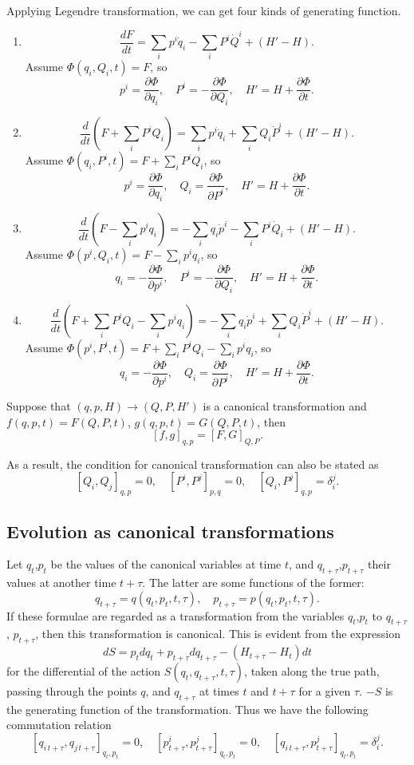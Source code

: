 Applying Legendre transformation, we can get four kinds of generating function. 
\begin{enumerate}
\item \[\frac{dF}{dt} = \sum_i p^i \dot{q}_i - \sum_i P^i \dot{Q}^i + (H'-H).\]
Assume $\Phi(q_i,Q_i,t) = F$, so
\[p^i = \frac{\partial \Phi}{\partial q_i} ,\quad P^i = -\frac{\partial \Phi}{\partial Q_i} ,\quad H' = H + \frac{\partial \Phi}{\partial t}.\]

\item \[\frac{d}{dt}(F+\sum_i P^i Q_i) = \sum_i p^i \dot{q}_i + \sum_i Q_i \dot{P}^i + (H'-H).\]
Assume $\Phi(q_i,P^i,t) = F + \sum_i P^i Q_i$, so
\[p^i = \frac{\partial \Phi}{\partial q_i} ,\quad Q_i = \frac{\partial \Phi}{\partial P^i} ,\quad H' = H + \frac{\partial \Phi}{\partial t}.\]

\item \[\frac{d}{dt}(F-\sum_i p^i q_i) = -\sum_i q_i \dot{p}^i - \sum_i P^i \dot{Q}_i + (H'-H).\]
Assume $\Phi(p^i,Q_i,t) = F - \sum_i p^i q_i$, so
\[q_i = -\frac{\partial \Phi}{\partial p^i} ,\quad P^i = -\frac{\partial \Phi}{\partial Q_i} ,\quad H' = H + \frac{\partial \Phi}{\partial t}.\]

\item \[\frac{d}{dt}(F+\sum_i P^i Q_i-\sum_i p^i q_i) = -\sum_i q_i \dot{p}^i + \sum_i Q_i \dot{P}^i + (H'-H).\]
Assume $\Phi(p^i,P^i,t) = F+\sum_i P^i Q_i-\sum_i p^i q_i$, so
\[q_i = -\frac{\partial \Phi}{\partial p^i} ,\quad Q_i = \frac{\partial \Phi}{\partial P^i} ,\quad H' = H + \frac{\partial \Phi}{\partial t}.\]
\end{enumerate}

\begin{newthem}
Suppose that $(q,p,H) \to (Q,P,H')$ is a canonical transformation and $f(q,p,t) = F(Q,P,t)$, $g(q,p,t) = G(Q,P,t)$, then
\[[f,g]_{q,p} = [F,G]_{Q,P}.\]
\end{newthem}
As a result, the condition for canonical transformation can also be stated as
\[[Q_i,Q_j]_{q,p} = 0, \quad [P^i,P^j]_{p,q} = 0, \quad [Q_i,P^j]_{q,p} = \delta_i^j.\]

\subsection{Evolution as canonical transformations}
Let $q_t$,$p_t$ be the values of the canonical variables at time $t$, and $q_{t+\tau}$,$p_{t+\tau}$ their values at another time $t+\tau$. The latter are some functions of the former:
\[q_{t+\tau} = q(q_t,p_t,t,\tau) ,\quad p_{t+\tau} = p(q_t,p_t,t,\tau).\]
If these formulae are regarded as a transformation from the variables $q_t$,$p_t$ to $q_{t+\tau}$, $p_{t+\tau}$, then this transformation is canonical. This is evident from the expression
\[dS = p_t dq_t + p_{t+\tau} dq_{t+\tau} -(H_{t+\tau}-H_t)dt \]
for the differential of the action $S(q_t,q_{t+\tau},t,\tau)$, taken along the true path, passing through the points $q$, and $q_{t+\tau}$ at times $t$ and $t+\tau$ for a given $\tau$. $-S$ is the generating function of the transformation. 
Thus we have the following commutation relation
\[[q_{i\,t+\tau},q_{j\,t+\tau}]_{q_t,p_t} = 0, \quad [p^i_{t+\tau},p^j_{t+\tau}]_{q_t,p_t} = 0, \quad [q_{i\,t+\tau},p^j_{t+\tau}]_{q_t,p_t} = \delta_i^j.\]

